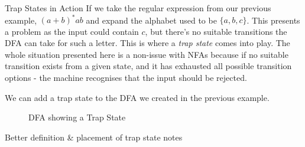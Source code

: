 \begin{example}{Trap States in Action}
If we take the regular expression from our previous example, $(a+b)^*ab$ and expand the alphabet used to be $\{a, b, c\}$. This presents a problem as the input could contain $c$, but there's no suitable transitions the DFA can take for such a letter. This is where a \textit{trap state} comes into play. The whole situation presented here is a non-issue with NFAs because if no suitable transition exists from a given state, and it has exhausted all possible transition options - the machine recognises that the input should be rejected.

We can add a trap state to the DFA we created in the previous example. 

\begin{figure}[H]
    \centering
    \caption{DFA showing a Trap State}
    \label{fig:dfa-showing-trap-state}
\end{figure}
\end{example}

\begin{todo}
Better definition \& placement of trap state notes
\end{todo}